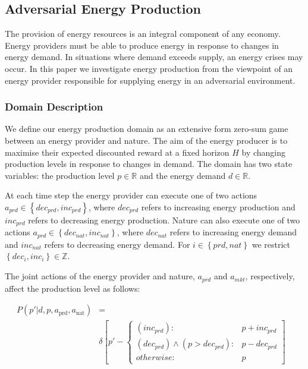 \subsection{Adversarial Energy Production}

The provision of energy resources is an integral component of any
economy. Energy providers must be able to produce energy in response
to changes in energy demand. In situations where demand exceeds supply,
an energy crises may occur. In this paper we investigate energy 
production from the viewpoint of an energy provider responsible for 
supplying energy in an adversarial environment.

\subsubsection{Domain Description}

We define our energy production domain as an extensive form zero-sum
game between an energy provider and nature. The aim of the energy
producer is to maximise their expected discounted reward at a 
fixed horizon $H$ by changing production levels in response to changes in demand.
The domain has two state variables: the production level $p \in \mathbb{R}$ and the energy demand
$d \in \mathbb{R}$. 

At each time step the energy provider can execute one of two actions
$a_{prd} \in \left\{dec_{prd}, inc_{prd}\right\}$, where $dec_{prd}$ 
refers to increasing energy production and $inc_{prd}$ refers to decreasing
energy production. Nature can also execute one of two actions
$a_{prd} \in \left\{dec_{nat}, inc_{nat}\right\}$, where $dec_{nat}$ 
refers to increasing energy demand and $inc_{nat}$ refers to decreasing
energy demand. For $i \in \left\{prd, nat\right\}$ we restrict 
$\left\{dec_i, inc_i\right\} \in \mathbb{Z}$.

The joint actions of the energy provider and nature, $a_{prd}$ and
$a_{mkt}$, respectively, affect the production level as follows:

{\tiny 
\begin{align*}
P(p' | d, p, a_{\text{prd}}, a_{\text{nat}}) &= \\
&
\delta \left[ p' - \begin{cases}
      (inc_{prd})  : & p + inc_{prd} \\
       (dec_{prd}) \wedge (p > dec_{prd}): & p - dec_{prd} \\
      otherwise: & p
    \end{cases} \right] & \\    
\end{align*}
}%

